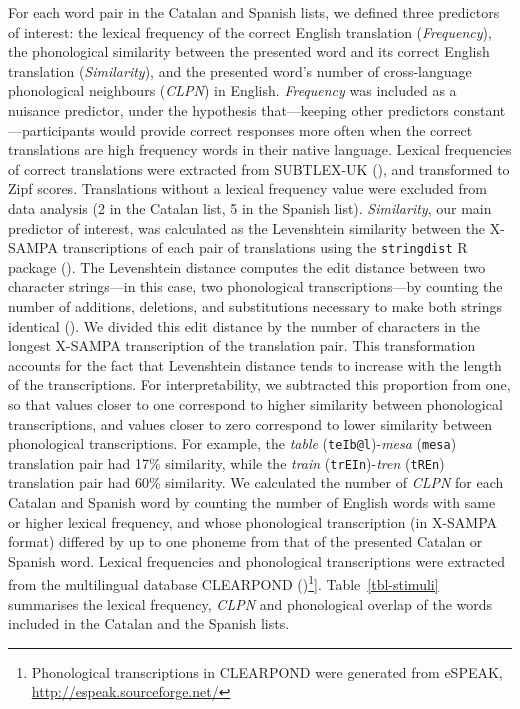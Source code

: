 \documentclass[
  man,
  longtable,
  nolmodern,
  notxfonts,
  notimes,
  colorlinks=true,linkcolor=blue,citecolor=blue,urlcolor=blue]{apa7}
\begin{document}
For each word pair in the Catalan and Spanish lists, we defined three
predictors of interest: the lexical frequency of the correct English
translation (\emph{Frequency}), the phonological similarity between the
presented word and its correct English translation (\emph{Similarity}),
and the presented word's number of cross-language phonological
neighbours (\emph{CLPN}) in English. \emph{Frequency} was included as a
nuisance predictor, under the hypothesis that---keeping other predictors
constant---participants would provide correct responses more often when
the correct translations are high frequency words in their native
language. Lexical frequencies of correct translations were extracted
from SUBTLEX-UK (), and transformed to Zipf scores. Translations without a lexical
frequency value were excluded from data analysis (2 in the Catalan list,
5 in the Spanish list). \emph{Similarity}, our main predictor of
interest, was calculated as the Levenshtein similarity between the
X-SAMPA transcriptions of each pair of translations using the
\texttt{stringdist} R package (). The Levenshtein distance computes the edit distance between
two character strings---in this case, two phonological
transcriptions---by counting the number of additions, deletions, and
substitutions necessary to make both strings identical
(). We divided
this edit distance by the number of characters in the longest X-SAMPA
transcription of the translation pair. This transformation accounts for
the fact that Levenshtein distance tends to increase with the length of
the transcriptions. For interpretability, we subtracted this proportion
from one, so that values closer to one correspond to higher similarity
between phonological transcriptions, and values closer to zero
correspond to lower similarity between phonological transcriptions. For
example, the \emph{table} (\texttt{teIb@l})-\emph{mesa} (\texttt{mesa})
translation pair had 17\% similarity, while the \emph{train}
(\texttt{trEIn})-\emph{tren} (\texttt{tREn}) translation pair had 60\%
similarity. We calculated the number of \emph{CLPN} for each Catalan and
Spanish word by counting the number of English words with same or higher
lexical frequency, and whose phonological transcription (in X-SAMPA
format) differed by up to one phoneme from that of the presented Catalan
or Spanish word. Lexical frequencies and phonological transcriptions
were extracted from the multilingual database CLEARPOND
()\footnote{Phonological
  transcriptions in CLEARPOND were generated from eSPEAK,
  \url{http://espeak.sourceforge.net/}}{]}. Table~\ref{tbl-stimuli}
summarises the lexical frequency, \emph{CLPN} and phonological overlap
of the words included in the Catalan and the Spanish lists.
\end{document}
